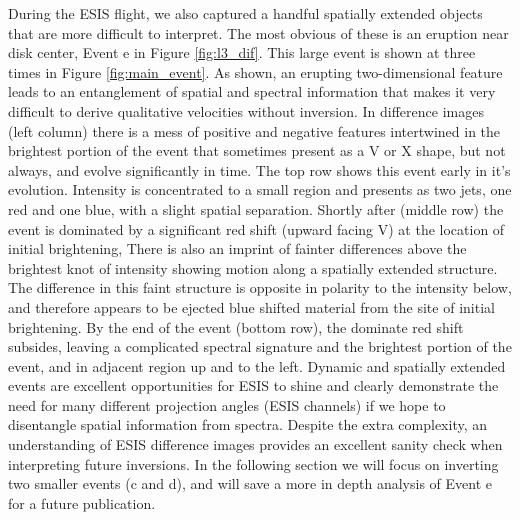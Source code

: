     	During the ESIS flight, we also captured a handful spatially extended objects that are more difficult to interpret.
    	The most obvious of these is an eruption near disk center, Event e in Figure \ref{fig:l3_dif}.
    	This large event is shown at three times in Figure \ref{fig:main_event}.
    	As shown, an erupting two-dimensional feature leads to an entanglement of spatial and spectral information that makes it very difficult to derive qualitative velocities without inversion.
    	In difference images (left column) there is a mess of positive and negative features intertwined in the brightest portion of the event that sometimes present as a V or X shape, but not always, and evolve significantly in time.
    	The top row shows this event early in it's evolution. 
    	Intensity is concentrated to a small region and presents as two jets, one red and one blue, with a slight spatial separation.
    	Shortly after (middle row) the event is dominated by a significant red shift (upward facing V) at the location of initial brightening, 
    	There is also an imprint of fainter differences above the brightest knot of intensity showing motion along a spatially extended structure.
    	The difference in this faint structure is opposite in polarity to the intensity below, and therefore appears to be ejected blue shifted material from the site of initial brightening.
    	By the end of the event (bottom row), the dominate red shift subsides, leaving a complicated spectral signature and the brightest portion of the event, and in adjacent region up and to the left.  
    	Dynamic and spatially extended events are excellent opportunities for ESIS to shine and clearly demonstrate the need for many different projection angles (ESIS channels) if we hope to disentangle spatial information from spectra.
    	Despite the extra complexity, an understanding of ESIS difference images provides an excellent sanity check when interpreting future inversions.
    	In the following section we will focus on inverting two smaller events (c and d), and will save a more in depth analysis of Event e for a future publication. 
    	
    
